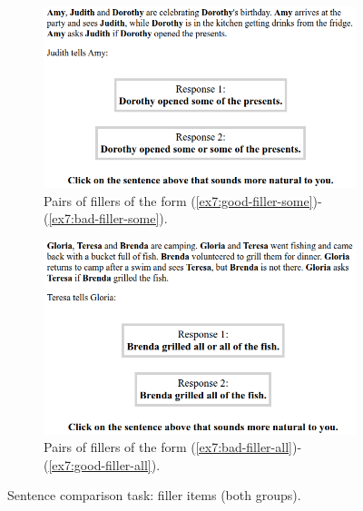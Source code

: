 \begin{figure}[H]
	\centering
	\begin{subfigure}[b]{.45\linewidth}
		\centering
		\includegraphics[width=\linewidth]{./exp2-screen-filler-some.png}
		\caption[]{Pairs of fillers of the form (\ref{ex7:good-filler-some})-(\ref{ex7:bad-filler-some}).}
	\end{subfigure}
	\hfill
	\begin{subfigure}[b]{.45\linewidth}
		\centering
		\includegraphics[width=\linewidth]{./exp2-screen-filler-all.png}
		\caption[]{Pairs of fillers of the form (\ref{ex7:bad-filler-all})-(\ref{ex7:good-filler-all}).}
	\end{subfigure}
	
	\caption[]{Sentence comparison task: filler items (both groups).}\label{fig7:exp2-screen-fillers}
\end{figure}


